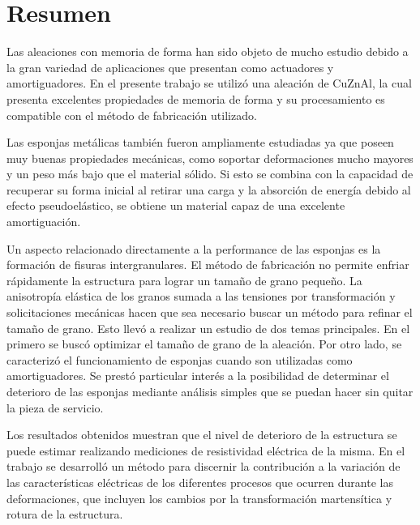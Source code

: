 \documentclass[a4paper,12pt,fleqn,twoside,openany]{book}
\begin{document}






\newpage
\thispagestyle{empty}
\cleardoublepage


\tableofcontents

\chapter*{Resumen}

Las aleaciones con memoria de forma han sido objeto de mucho estudio debido a la gran variedad de aplicaciones que presentan como actuadores y amortiguadores. En el presente trabajo se utilizó una aleación de CuZnAl, la cual presenta excelentes propiedades de memoria de forma y su procesamiento es compatible con el método de fabricación utilizado.
 
Las esponjas metálicas también fueron ampliamente estudiadas ya que poseen muy buenas propiedades mecánicas, como soportar deformaciones mucho mayores y un peso más bajo que el material sólido. Si esto se combina con la capacidad de recuperar su forma inicial al retirar una carga y la absorción de energía debido al efecto pseudoelástico, se obtiene un material capaz de una excelente amortiguación.

Un aspecto relacionado directamente a la performance de las esponjas es la formación de fisuras intergranulares. El método de fabricación no permite enfriar rápidamente la estructura para lograr un tamaño de grano pequeño. La anisotropía elástica de los granos sumada a las tensiones por transformación y solicitaciones mecánicas hacen que sea necesario buscar un método para refinar el tamaño de grano. Esto llevó a realizar un estudio de dos temas principales. En el primero se buscó optimizar el tamaño de grano de la
aleación. Por otro lado, se caracterizó el funcionamiento de esponjas cuando son utilizadas como amortiguadores. Se prestó particular interés a la posibilidad de determinar el deterioro de las esponjas mediante análisis simples que se puedan hacer sin quitar la pieza de servicio.
 
Los resultados obtenidos muestran que el nivel de deterioro de la estructura se puede estimar realizando mediciones de resistividad eléctrica de la misma. En el trabajo se desarrolló un método para discernir la contribución a la variación de las características eléctricas de los diferentes procesos que ocurren durante las deformaciones, que incluyen los cambios por la transformación martensítica y rotura de la estructura.
\end{document}
